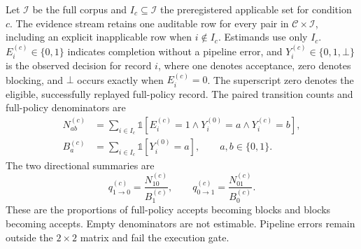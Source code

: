 Let \(\mathcal I\) be the full corpus and \(I_c\subseteq\mathcal I\) the
preregistered applicable set for condition \(c\). The evidence stream retains
one auditable row for every pair in \(\mathcal C\times\mathcal I\), including an
explicit inapplicable row when \(i\notin I_c\). Estimands use only \(I_c\).
\(E_i^{(c)}\in\{0,1\}\) indicates completion without a pipeline error, and
\(Y_i^{(c)}\in\{0,1,\bot\}\) is the observed decision for record \(i\), where
one denotes acceptance, zero denotes blocking, and \(\bot\) occurs exactly
when \(E_i^{(c)}=0\). The superscript zero denotes the eligible, successfully
replayed full-policy record. The paired transition counts and full-policy
denominators are
\begin{equation}
 \begin{aligned}
 N_{ab}^{(c)}
 &=\sum_{i\in I_c}
   \mathbb{1}\!\left[E_i^{(c)}=1
   \land Y_i^{(0)}=a\land Y_i^{(c)}=b\right],\\
 B_a^{(c)}
 &=\sum_{i\in I_c}\mathbb{1}\!\left[Y_i^{(0)}=a\right],
 \qquad a,b\in\{0,1\}.
 \end{aligned}
 \label{eq:ablation-transitions}
\end{equation}
The two directional summaries are
\begin{equation}
 q_{1\rightarrow0}^{(c)}
 =\frac{N_{10}^{(c)}}{B_1^{(c)}},
 \qquad
 q_{0\rightarrow1}^{(c)}
 =\frac{N_{01}^{(c)}}{B_0^{(c)}}.
 \label{eq:ablation-proportions}
\end{equation}
These are the proportions of full-policy accepts becoming blocks and blocks
becoming accepts. Empty denominators are not estimable. Pipeline errors remain
outside the \(2\times2\) matrix and fail the execution gate.

